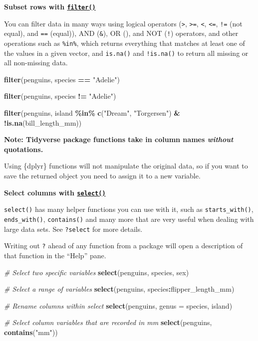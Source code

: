 \documentclass[
]{book}
\newenvironment{Shaded}{\begin{snugshade}}{\end{snugshade}}
\newcommand{\AttributeTok}[1]{\textcolor[rgb]{0.13,0.29,0.53}{#1}}
\newcommand{\CommentTok}[1]{\textcolor[rgb]{0.56,0.35,0.01}{\textit{#1}}}
\newcommand{\FunctionTok}[1]{\textcolor[rgb]{0.13,0.29,0.53}{\textbf{#1}}}
\newcommand{\NormalTok}[1]{#1}
\newcommand{\SpecialCharTok}[1]{\textcolor[rgb]{0.81,0.36,0.00}{\textbf{#1}}}
\newcommand{\StringTok}[1]{\textcolor[rgb]{0.31,0.60,0.02}{#1}}
\begin{document}
\textbf{Subset rows with \href{https://dplyr.tidyverse.org/reference/filter.html}{\texttt{filter()}}}

You can filter data in many ways using logical operators (\texttt{\textgreater{}}, \texttt{\textgreater{}=}, \texttt{\textless{}}, \texttt{\textless{}=}, \texttt{!=} (not equal), and \texttt{==} (equal)), AND (\texttt{\&}), OR (\texttt{\textbar{}}), and NOT (\texttt{!}) operators, and other operations such as \texttt{\%in\%}, which returns everything that matches at least one of the values in a given vector, and \texttt{is.na()} and \texttt{!is.na()} to return all missing or all non-missing data.

\begin{Shaded}
\begin{Highlighting}[]
\FunctionTok{filter}\NormalTok{(penguins, species }\SpecialCharTok{==} \StringTok{"Adelie"}\NormalTok{)}

\FunctionTok{filter}\NormalTok{(penguins, species }\SpecialCharTok{!=} \StringTok{"Adelie"}\NormalTok{)}

\FunctionTok{filter}\NormalTok{(penguins, island }\SpecialCharTok{\%in\%} \FunctionTok{c}\NormalTok{(}\StringTok{"Dream"}\NormalTok{, }\StringTok{"Torgersen"}\NormalTok{) }\SpecialCharTok{\&} \SpecialCharTok{!}\FunctionTok{is.na}\NormalTok{(bill\_length\_mm))}
\end{Highlighting}
\end{Shaded}

\textbf{Note: Tidyverse package functions take in column names \emph{without} quotations.}

Using \{dplyr\} functions will not manipulate the original data, so if you want to save the returned object you need to assign it to a new variable.

\textbf{Select columns with \href{https://dplyr.tidyverse.org/reference/select.html}{\texttt{select()}}}

\texttt{select()} has many helper functions you can use with it, such as \texttt{starts\_with()}, \texttt{ends\_with()}, \texttt{contains()} and many more that are very useful when dealing with large data sets. See \texttt{?select} for more details.

Writing out \texttt{?} ahead of any function from a package will open a description of that function in the ``Help'' pane.

\begin{Shaded}
\begin{Highlighting}[]
\CommentTok{\# Select two specific variables}
\FunctionTok{select}\NormalTok{(penguins, species, sex)}

\CommentTok{\# Select a range of variables}
\FunctionTok{select}\NormalTok{(penguins, species}\SpecialCharTok{:}\NormalTok{flipper\_length\_mm)}

\CommentTok{\# Rename columns within select}
\FunctionTok{select}\NormalTok{(penguins, }\AttributeTok{genus =}\NormalTok{ species, island)}

\CommentTok{\# Select column variables that are recorded in mm}
\FunctionTok{select}\NormalTok{(penguins, }\FunctionTok{contains}\NormalTok{(}\StringTok{"mm"}\NormalTok{))}
\end{Highlighting}
\end{Shaded}
\end{document}
